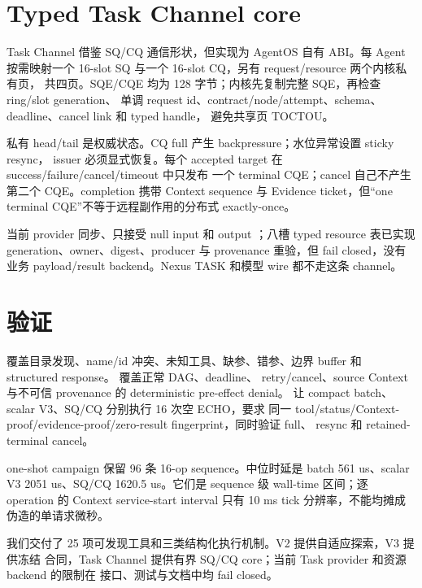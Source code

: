 \section{Typed Task Channel core}

Task Channel 借鉴 SQ/CQ 通信形状\cite{iouring}，但实现为 AgentOS 自有 ABI。每 Agent
按需映射一个 16-slot SQ 与一个 16-slot CQ，另有 request/resource 两个内核私有页，
共四页。SQE/CQE 均为 128 字节；内核先复制完整 SQE，再检查 ring/slot generation、
单调 request id、contract/node/attempt、schema、deadline、cancel link 和 typed handle，
避免共享页 TOCTOU。

私有 head/tail 是权威状态。CQ full 产生 backpressure；水位异常设置 sticky resync，
issuer 必须显式恢复。每个 accepted target 在 success/failure/cancel/timeout 中只发布
一个 terminal CQE；cancel 自己不产生第二个 CQE。completion 携带 Context sequence 与
Evidence ticket，但“one terminal CQE”不等于远程副作用的分布式 exactly-once。

当前 provider 同步、只接受 null input 和 output ；八槽 typed resource
表已实现 generation、owner、digest、producer 与 provenance 重验，但
 fail closed，没有业务 payload/result backend。Nexus TASK 和模型
wire 都不走这条 channel。

\section{验证}

 覆盖目录发现、name/id 冲突、未知工具、缺参、错参、边界
buffer 和 structured response。 覆盖正常 DAG、deadline、
retry/cancel、source Context 与不可信 provenance 的 deterministic pre-effect denial。
 让 compact batch、scalar V3、SQ/CQ 分别执行 16 次空 ECHO，要求
同一 tool/status/Context-proof/evidence-proof/zero-result fingerprint，同时验证 full、
resync 和 retained-terminal cancel。

one-shot campaign 保留 96 条 16-op sequence。中位时延是 batch 561 us、scalar V3
2051 us、SQ/CQ 1620.5 us。它们是 sequence 级 wall-time 区间；逐 operation 的 Context
service-start interval 只有 10 ms tick 分辨率，不能均摊成伪造的单请求微秒。

\begin{evidencebox}[任务二结论]
我们交付了 25 项可发现工具和三类结构化执行机制。V2 提供自适应探索，V3 提供冻结
合同，Task Channel 提供有界 SQ/CQ core；当前 Task provider 和资源 backend 的限制在
接口、测试与文档中均 fail closed。
\end{evidencebox}
